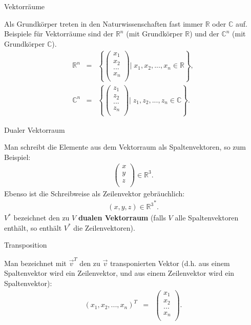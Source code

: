 \documentclass[german]{beamer}
\newcommand{\bq}{\begin{eqnarray*}}
\newcommand{\eq}{\end{eqnarray*}}
\begin{document}
\begin{frame}{Vektorr\"aume}

Als Grundk\"orper treten in den Naturwissenschaften fast immer $\mathbb R$ oder $\mathbb C$ auf.
Beispiele f\"ur Vektorr\"aume sind der ${\mathbb R}^n$  (mit Grundk\"orper $\mathbb R$)
und der ${\mathbb C}^n$ (mit Grundk\"orper $\mathbb C$).
\bq
 {\mathbb R}^n & = & \left\{ \left( \begin{array}{c} x_1 \\ x_2 \\ ... \\ x_n \\ \end{array} \right) | \; x_1,x_2,...,x_n \in {\mathbb R} \right\},
 \nonumber \\
 {\mathbb C}^n & = & \left\{ \left( \begin{array}{c} z_1 \\ z_2 \\ ... \\ z_n \\ \end{array} \right) | \; z_1,z_2,...,z_n \in {\mathbb C} \right\}.
\eq

\end{frame}

\begin{frame}{Dualer Vektorraum}

Man schreibt die Elemente aus dem Vektorraum als Spaltenvektoren, so zum Beispiel:
\bq
 \left( \begin{array}{c} x \\ y \\ z \\ \end{array} \right) \in {\mathbb R}^3.
\eq
Ebenso ist die Schreibweise als Zeilenvektor gebr\"auchlich:
\bq
 \left( x, y, z \right) \in \left.{\mathbb R}^3\right.^\ast.
\eq
$V^\ast$ bezeichnet den zu $V$ {\bf dualen Vektorraum} (falls $V$ alle Spaltenvektoren enth\"alt,
so enth\"alt $V^\ast$ die Zeilenvektoren).

\end{frame}

\begin{frame}{Transposition}

Man bezeichnet mit $\vec{v}^T$ den zu $\vec{v}$ transponierten Vektor
(d.h. aus einem Spaltenvektor wird ein Zeilenvektor, und aus einem Zeilenvektor
wird ein Spaltenvektor):
\bq
 \left( x_1, x_2, ..., x_n \right)^T 
 & = & 
 \left( \begin{array}{c} x_1 \\ x_2 \\ ... \\ x_n \\ \end{array} \right).
\eq

\end{frame}
\end{document}
